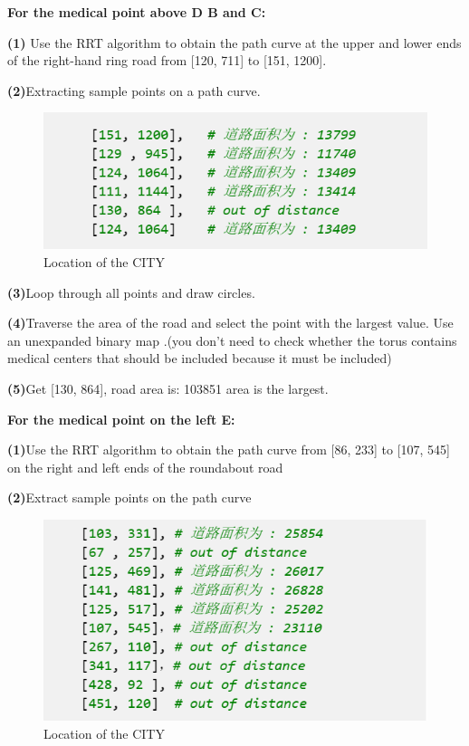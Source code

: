 \documentclass{article} %
\begin{document}
\textbf{For the medical point above D  B and C:}


\textbf{(1)} Use the RRT algorithm to obtain the path curve at the upper and lower ends of the right-hand ring road from [120, 711] to [151, 1200].


\textbf{(2)}Extracting sample points on a path curve.


\begin{figure}[h]
    \centering
    \includegraphics[scale=0.7]{61.png}
    \caption{Location of the CITY}
\end{figure}


\textbf{(3)}Loop through all points and draw circles.


\textbf{(4)}Traverse the area of the road and select the point with the largest value. Use an unexpanded binary map .(you don't need to check whether the torus contains medical centers that should be included because it must be included)


\textbf{(5)}Get [130, 864], road area is: 103851 area is the largest.


\textbf{For the medical point on the left E:}


\textbf{(1)}Use the RRT algorithm to obtain the path curve from [86, 233] to [107, 545] on the right and left ends of the roundabout road


\textbf{(2)}Extract sample points on the path curve


\begin{figure}[h]
    \centering
    \includegraphics[scale=0.7]{62.png}
    \caption{Location of the CITY}
\end{figure}
\end{document}
